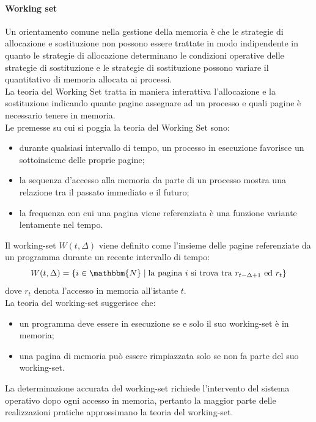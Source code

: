 \documentclass[12pt, letterpaper]{report}
\begin{document}
	\paragraph{Working set} Un orientamento comune nella gestione della memoria è che le strategie di allocazione e sostituzione non possono essere trattate in modo indipendente in quanto le strategie di allocazione determinano le condizioni operative delle strategie di sostituzione e le strategie di sostituzione possono variare il quantitativo di memoria allocata ai processi. \\
	La teoria del Working Set tratta in maniera interattiva l'allocazione e la sostituzione indicando quante pagine assegnare ad un processo e quali pagine è necessario tenere in memoria. \\
	Le premesse su cui si poggia la teoria del Working Set sono:
	\begin{itemize}
		\item durante qualsiasi intervallo di tempo, un processo in esecuzione favorisce un sottoinsieme delle proprie pagine;
		\item la sequenza d'accesso alla memoria da parte di un processo mostra una relazione tra il passato immediato e il futuro;
		\item la frequenza con cui una pagina viene referenziata è una funzione variante lentamente nel tempo.
	\end{itemize}
	Il working-set $W(t, \Delta)$ viene definito come l'insieme delle pagine referenziate da un programma durante un recente intervallo di tempo:
	\[
	W(t, \Delta) = \{i \in \mathbbm{N} \mid \text{la pagina $i$ si trova tra $r_{t - \Delta + 1}$ ed $r_t$}\}
	\]
	dove $r_t$ denota l'accesso in memoria all'istante $t$. \\
	La teoria del working-set suggerisce che:
	\begin{itemize}
		\item un programma deve essere in esecuzione se e solo il suo working-set è in memoria;
		\item una pagina di memoria può essere rimpiazzata solo se non fa parte del suo working-set.
	\end{itemize}
	La determinazione accurata del working-set richiede l'intervento del sistema operativo dopo ogni accesso in memoria, pertanto la maggior parte delle realizzazioni pratiche approssimano la teoria del working-set.
\end{document}
